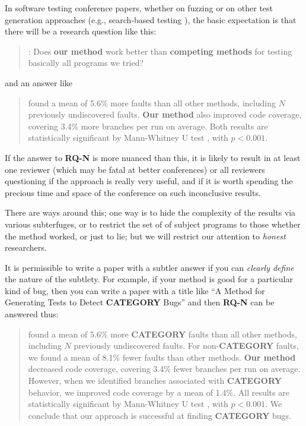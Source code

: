 \documentclass[sigplan,screen]{acmart}
\begin{document}
In software testing conference papers, whether on fuzzing or on other test
generation approaches (e.g., search-based testing \cite{McMinn04search-basedsoftware}), the basic
expectation is that there will be a research question like this:

\begin{quote}
:  Does {\bf our method} work better than {\bf competing
  methods} for testing basically all programs we tried?
\end{quote}

\noindent and an answer like

\begin{quote}
 found a mean of 5.6\% more faults than all
other methods, including $N$ previously undiscovered faults.  {\bf Our
  method} also improved code coverage, covering 3.4\% more branches
per run on average.  Both results are statistically significant by
Mann-Whitney U test \cite{arcuri2014hitchhiker}, with $p < 0.001$.
\end{quote}

If the answer to {\bf RQ-N} is more nuanced than this, it is likely to result in
at least one reviewer (which may be fatal at better conferences) or
all reviewers questioning if the approach is really very useful, and
if it is worth spending the precious time and space of the conference
on such inconclusive results.

There are ways around this; one way is to hide the complexity of the
results via various subterfuges, or to restrict the set of of subject
programs to those whether the method worked, or just to lie; but we
will restrict our attention to \emph{honest} researchers.

It is permissible to write a paper with a subtler answer if you can
\emph{clearly define} the nature of the subtlety.  For example, if
your method is good for a particular kind of bug, then you can write a
paper with a title like ``A Method for Generating Tests to Detect {\bf
  CATEGORY} Bugs'' and then {\bf RQ-N} can be answered thus:


\begin{quote}
 found a mean of 5.6\% more {\bf CATEGORY} faults than all
other methods, including $N$ previously undiscovered faults.  For
non-{\bf CATEGORY} faults, we found a mean of 8.1\% fewer faults than
other methods. {\bf Our
  method} decreased code coverage, covering 3.4\% fewer branches
per run on average.  However, when we identified branches associated
with {\bf CATEGORY} behavior, we improved code coverage by a mean of
1.4\%.  All results are statistically significant by
Mann-Whitney U test \cite{arcuri2014hitchhiker}, with $p < 0.001$.  We
conclude that our approach is successful at finding {\bf CATEGORY} bugs.
\end{quote}
\end{document}
